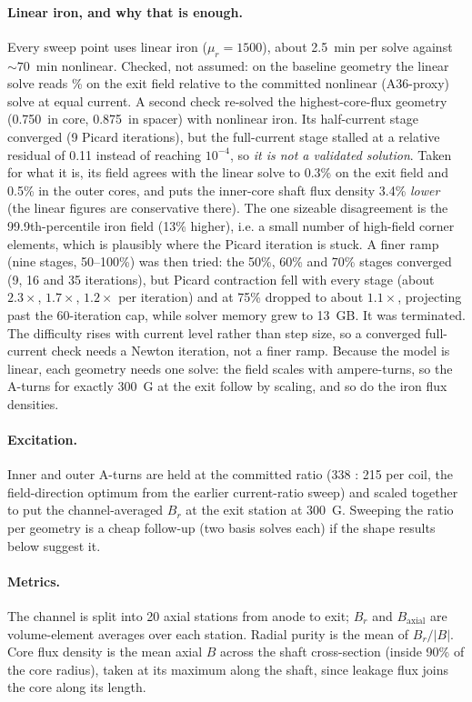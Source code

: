 \documentclass[10pt]{article}
\begin{document}
\paragraph{Linear iron, and why that is enough.} Every sweep point uses linear iron ($\mu_r=1500$), about 2.5~min per solve against ${\sim}70$~min nonlinear. Checked, not assumed: on the baseline geometry the linear solve reads \LinVsNLPct\% on the exit field relative to the committed nonlinear (A36-proxy) solve at equal current. A second check re-solved the highest-core-flux geometry (0.750~in core, 0.875~in spacer) with nonlinear iron. Its half-current stage converged (9 Picard iterations), but the full-current stage stalled at a relative residual of 0.11 instead of reaching $10^{-4}$, so \emph{it is not a validated solution}. Taken for what it is, its field agrees with the linear solve to 0.3\% on the exit field and 0.5\% in the outer cores, and puts the inner-core shaft flux density 3.4\% \emph{lower} (the linear figures are conservative there). The one sizeable disagreement is the 99.9th-percentile iron field (13\% higher), i.e. a small number of high-field corner elements, which is plausibly where the Picard iteration is stuck. A finer ramp (nine stages, 50--100\%) was then tried: the 50\%, 60\% and 70\% stages converged (9, 16 and 35 iterations), but Picard contraction fell with every stage (about $2.3\times$, $1.7\times$, $1.2\times$ per iteration) and at 75\% dropped to about $1.1\times$, projecting past the 60-iteration cap, while solver memory grew to 13~GB. It was terminated. The difficulty rises with current level rather than step size, so a converged full-current check needs a Newton iteration, not a finer ramp.
Because the model is linear, each geometry needs one solve: the field scales with ampere-turns, so the A-turns for exactly 300~G at the exit follow by scaling, and so do the iron flux densities.

\paragraph{Excitation.} Inner and outer A-turns are held at the committed ratio (338 : 215 per coil, the field-direction optimum from the earlier current-ratio sweep) and scaled together to put the channel-averaged $B_r$ at the exit station at 300~G. Sweeping the ratio per geometry is a cheap follow-up (two basis solves each) if the shape results below suggest it.

\paragraph{Metrics.} The channel is split into 20 axial stations from anode to exit; $B_r$ and $B_\text{axial}$ are volume-element averages over each station. Radial purity is the mean of $B_r/|B|$. Core flux density is the mean axial $B$ across the shaft cross-section (inside 90\% of the core radius), taken at its maximum along the shaft, since leakage flux joins the core along its length.
\end{document}
